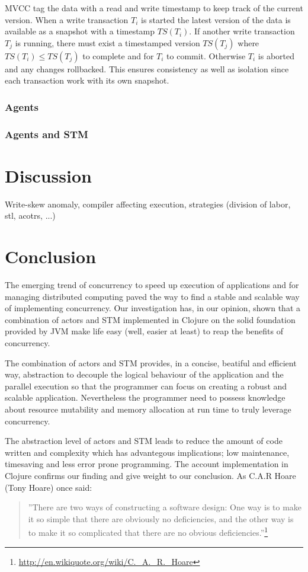 \documentclass[a4paper,12pt]{kth-mag}
\begin{document}
MVCC tag the data with a read and write timestamp to keep track of the current version. When a write transaction $T_i$ is started the latest version of the data is available as a snapshot with a timestamp $TS(T_i)$. If another write transaction $T_j$ is running, there must exist a timestamped version $TS(T_j)$ where $TS(T_i) \le TS(T_j)$ to complete and for $T_i$ to commit. Otherwise $T_i$ is aborted and any changes rollbacked. This ensures consistency as well as isolation since each transaction work with its own snapshot.

\section{Agents}
\section{Agents and STM}

\part{Discussion}
Write-skew anomaly, compiler affecting execution, strategies (division of labor, stl, acotrs, ...)

\part{ Conclusion}
The emerging trend of concurrency to speed up execution of applications and for managing distributed computing paved the way to find a stable and scalable way of implementing concurrency. Our investigation has, in our opinion, shown that a combination of actors and STM implemented in Clojure on the solid foundation provided by JVM make life easy (well, easier at least) to reap the benefits of concurrency.

The combination of actors and STM provides, in a concise, beatiful and efficient way, abstraction to decouple the logical behaviour of the application and the parallel execution so that the programmer can focus on creating a robust and scalable application. Nevertheless the programmer need to possess knowledge about resource mutability and memory allocation at run time to truly leverage concurrency.

The abstraction level of actors and STM leads to reduce the amount of code written and complexity which has advantegous implications; low maintenance, timesaving and less error prone programming. The account implementation in Clojure confirms our finding and give weight to our conclusion. As C.A.R Hoare (Tony Hoare) once said:
\begin{quote}
''There are two ways of constructing a software design: One way is to make it so simple that there are obviously no deficiencies, and the other way is to make it so complicated that there are no obvious deficiencies.''\footnote{\url{http://en.wikiquote.org/wiki/C._A._R._Hoare}}
\end{quote}
\end{document}

